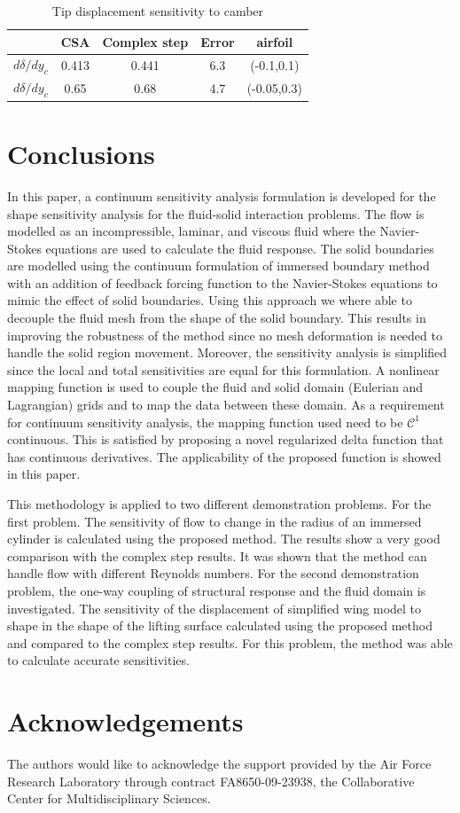 \documentclass{aiaa-pretty}
\begin{document}
%
\begin{table}[H]
\centering
\begin{tabular}{c|c|c|c|c}
 & \multicolumn{1}{l|}{CSA} & \multicolumn{1}{l|}{Complex step} & \multicolumn{1}{l|}{Error} & airfoil \\ \hline
$d\delta/dy_c$ & 0.413 & 0.441 & 6.3 & (-0.1,0.1) \\ \hline
$d\delta/dy_c$ & 0.65 & 0.68 & 4.7 & (-0.05,0.3) \\
\end{tabular}
\label{table:sensitivity}
\caption{Tip displacement sensitivity to camber}
\end{table}
%
\section{Conclusions}
In this paper, a continuum sensitivity analysis formulation is developed for the shape sensitivity analysis for the fluid-solid interaction problems. The flow is modelled as an incompressible, laminar, and viscous fluid where the Navier-Stokes equations are used to calculate the fluid response. The solid boundaries are modelled using the continuum formulation of immersed boundary method with an addition of feedback forcing function to the Navier-Stokes equations to mimic the effect of solid boundaries. Using this approach we where able to decouple the fluid mesh from the shape of the solid boundary. This results in improving the robustness of the method since no mesh deformation is needed to handle the solid region movement. Moreover, the sensitivity analysis is simplified since the local and total sensitivities are equal for this formulation. A nonlinear mapping function is used to couple the fluid and solid domain (Eulerian and Lagrangian) grids and to map the data between these domain. As a requirement for continuum sensitivity analysis, the mapping function used need to be $\mathcal{C}^1$ continuous. This is satisfied by proposing a novel regularized delta function that has continuous derivatives. The applicability of the proposed function is showed in this paper.

This methodology is applied to two different demonstration problems. For the first problem. The sensitivity of flow to change in the radius of an immersed cylinder is calculated using the proposed method. The results show a very good comparison with the complex step results. It was shown that the method can handle flow with different Reynolds numbers. For the second demonstration problem, the one-way coupling of structural response and the fluid domain is investigated. The sensitivity of the displacement of simplified wing model to shape in the shape of the lifting surface calculated using the proposed method and compared to the complex step results. For this problem, the method was able to calculate accurate sensitivities.
\section*{Acknowledgements}
The authors would like to acknowledge the support provided by the Air Force Research Laboratory through contract FA8650-09-23938, the Collaborative Center for Multidisciplinary Sciences.


\end{document}
